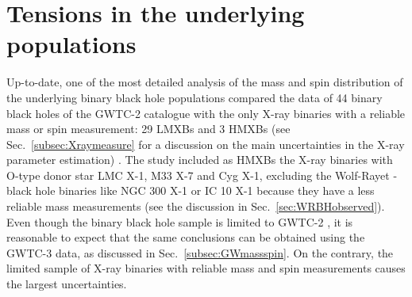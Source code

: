 \documentclass[a4paper,titlepage]{book}     	%
\begin{document}
\section{Tensions in the underlying populations}%
Up-to-date, one of the most detailed analysis of the mass and spin distribution of the underlying binary black hole populations compared the data of 44 binary black holes of the GWTC-2 catalogue with the only X-ray binaries with a reliable mass or spin measurement: 29 LMXBs and 3 HMXBs (see Sec.\ \ref{subsec:Xraymeasure} for a discussion on the main uncertainties in the X-ray parameter estimation) \cite{HMXBH_spins2021}. The study included as HMXBs the X-ray binaries with O-type donor star LMC X-1, M33 X-7 and Cyg X-1, excluding the Wolf-Rayet - black hole binaries like NGC 300 X-1 or IC 10 X-1 because they have a less reliable mass measurements \cite{ICX10X-1_Laycock2015_revisited} (see the discussion in Sec.\ \ref{sec:WRBHobserved}). Even though the binary black hole sample is limited to GWTC-2 \cite{GWTC-2}, it is reasonable to expect that the same conclusions can be obtained using the GWTC-3 data, as discussed in Sec.\ \ref{subsec:GWmassspin}. On the contrary, the limited sample of X-ray binaries with reliable mass and spin measurements causes the largest uncertainties.
\end{document}
